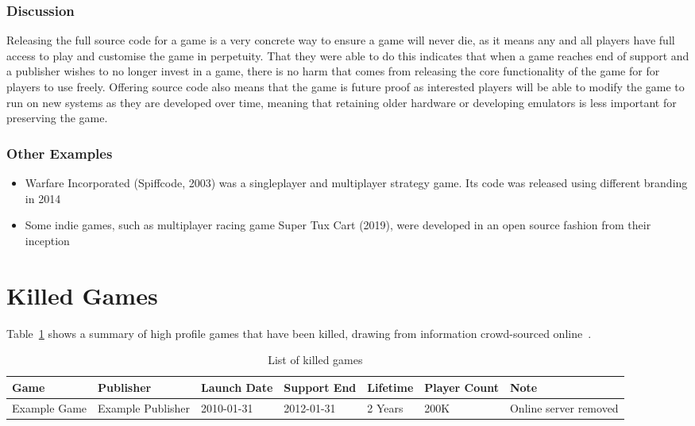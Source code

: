 \subsubsection*{Discussion}
Releasing the full source code for a game is a very concrete way to ensure a game will never die, as it means any and all players have full access to play and customise the game in perpetuity.
That they were able to do this indicates that when a game reaches end of support and a publisher wishes to no longer invest in a game,
there is no harm that comes from releasing the core functionality of the game for for players to use freely.
Offering source code also means that the game is future proof as interested players will be able to modify the game to run on new systems as they are developed over time,
meaning that retaining older hardware or developing emulators is less important for preserving the game.

\subsubsection*{Other Examples}
\begin{itemize}
    \item Warfare Incorporated (Spiffcode, 2003) was a singleplayer and multiplayer strategy game. Its code was released using different branding in 2014\cite{spiffcode-2014}
    \item Some indie games, such as multiplayer racing game Super Tux Cart (2019), were developed in an open source fashion from their inception\cite{supertux-2019}
\end{itemize}

\section{Killed Games}


Table~\ref{tab:killedgames} shows a summary of high profile games that have been killed, drawing from information crowd-sourced online~\cite{dead-games-list-2016}.

\begin{landscape}
\begin{table}[htbp]
    \centering
    \caption{List of killed games}%
    \label{tab:killedgames}
    \begin{tabular*}{1\textwidth}{lllllll}
        Game & Publisher & Launch Date & Support End & Lifetime & Player Count & Note \\ \toprule
        Example Game & Example Publisher & 2010-01-31 & 2012-01-31 & 2 Years & 200K & Online server removed \\
    \end{tabular*}
\end{table}
\end{landscape}

